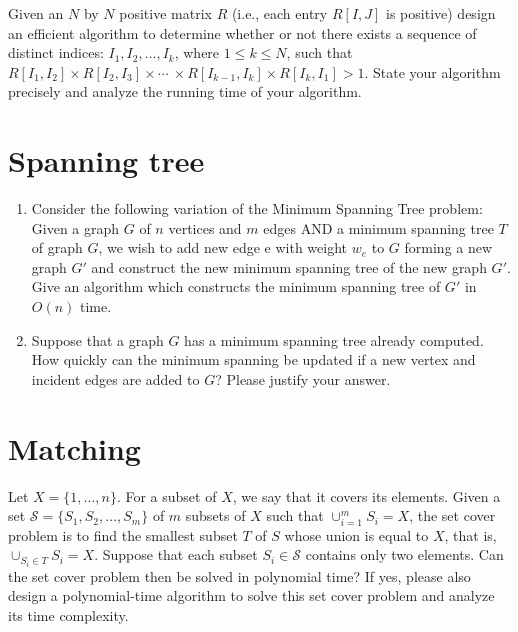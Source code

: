 \begin{Exercise}
Given an $N$ by $N$ positive matrix $R$ (i.e., each entry $R[I, J]$ is positive) design an efficient algorithm to determine whether or not there exists a sequence of distinct indices: $I_1, I_2, \dots, I_k$, where $1 \leq k \leq N$, such that $ R[I_1, I_2] \times R[I_2, I_3] \times \cdots \ \times R[I_{k-1}, I_k] \times R[I_k, I_1] > 1$. State your algorithm precisely and analyze the running time of your algorithm. 
\end{Exercise}
\begin{Answer}
\end{Answer}

\section{Spanning tree}
\begin{Exercise}
\begin{enumerate}
\item Consider the following variation of the Minimum Spanning Tree problem: Given a graph $G$ of $n$ vertices and $m$ edges AND a minimum spanning tree $T$ of graph $G$, we wish to add new edge e with weight $w_e$ to $G$ forming a new graph $G'$ and construct the new minimum spanning tree of the new graph $G'$. Give an algorithm which constructs the minimum spanning tree of $G'$ in $O(n)$ time. 
\item Suppose that a graph $G$ has a minimum spanning tree already computed. How quickly can the minimum spanning be updated if a new vertex and incident edges are added to $G$? Please justify your answer.
\end{enumerate}
\end{Exercise}
\begin{Answer}
\end{Answer}

\section{Matching}
\begin{Exercise}
Let $X = \{1, \dots, n\}$. For a subset of $X$, we say that it covers its elements. Given a set $\mathcal{S} = \{ S_1, S_2, \dots, S_m\}$ of $m$ subsets of $X$ such that $\cup_{i=1}^m S_i = X$, the set cover problem is to find the smallest subset $T$ of $S$ whose union is equal to $X$, that is, $\cup_{S_i \in T} S_i = X$. Suppose that each subset $S_i \in \mathcal{S}$ contains only two elements. Can the set cover problem then be solved in polynomial time? If yes, please also design a polynomial-time algorithm to solve this set cover problem and analyze its time complexity. 
\end{Exercise}
\begin{Answer}
\end{Answer}

